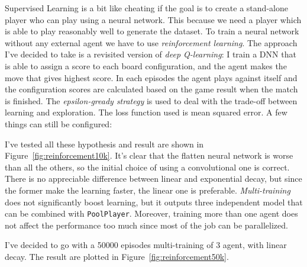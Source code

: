 \documentclass{article}
\newcommand{\ipy}[1]{\texttt{#1}}
\begin{document}
  Supervised Learning is a bit like cheating if the goal is to create a stand-alone player who can play using a neural network. This because we need a player which is able to play reasonably well to generate the dataset. To train a neural network without any external agent we have to use \emph{reinforcement learning}. The approach I've decided to take is a revisited version of \emph{deep Q-learning}: I train a DNN that is able to assign a score to each board configuration, and the agent makes the move that gives highest score. In each episodes the agent plays against itself and the configuration scores are calculated based on the game result when the match is finished. The \emph{epsilon-gready strategy} is used to deal with the trade-off between learning and exploration. The loss function used is mean squared error. A few things can still be configured:
%    

  I've tested all these hypothesis and result are shown in Figure~\ref{fig:reinforcement10k}. It's clear that the flatten neural network is worse than all the others, so the initial choice of using a convolutional one is correct. There is no appreciable difference between linear and exponential decay, but since the former make the learning faster, the linear one is preferable.
  \emph{Multi-training} does not significantly boost learning, but it outputs three independent model that can be combined with \ipy{PoolPlayer}. Moreover, training more than one agent does not affect the performance too much since most of the job can be parallelized.
 
  I've decided to go with a 50000 episodes multi-training of 3 agent, with linear decay. The result are plotted in Figure~\ref{fig:reinforcement50k}. 
  
\end{document}

